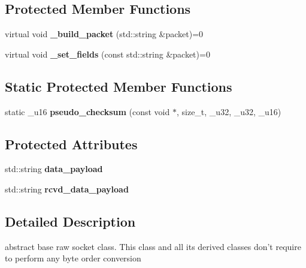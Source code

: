 \subsection*{Protected Member Functions}
\begin{CompactItemize}
\item 
\hypertarget{classsocketpp_1_1RawSocket_eb0a3f716c0fc46efa4123acf0fe1e66}{
virtual void \textbf{\_\-build\_\-packet} (std::string \&packet)=0}
\label{classsocketpp_1_1RawSocket_eb0a3f716c0fc46efa4123acf0fe1e66}

\item 
\hypertarget{classsocketpp_1_1RawSocket_45e6b041703cb8ae0f93dd19766865d5}{
virtual void \textbf{\_\-set\_\-fields} (const std::string \&packet)=0}
\label{classsocketpp_1_1RawSocket_45e6b041703cb8ae0f93dd19766865d5}

\end{CompactItemize}
\subsection*{Static Protected Member Functions}
\begin{CompactItemize}
\item 
\hypertarget{classsocketpp_1_1RawSocket_c9422942a0ed23c9900d26426a96a0ee}{
static \_\-u16 \textbf{pseudo\_\-checksum} (const void $\ast$, size\_\-t, \_\-u32, \_\-u32, \_\-u16)}
\label{classsocketpp_1_1RawSocket_c9422942a0ed23c9900d26426a96a0ee}

\end{CompactItemize}
\subsection*{Protected Attributes}
\begin{CompactItemize}
\item 
\hypertarget{classsocketpp_1_1RawSocket_4d3a1236c4ac42ab029323ae14586ff8}{
std::string \textbf{data\_\-payload}}
\label{classsocketpp_1_1RawSocket_4d3a1236c4ac42ab029323ae14586ff8}

\item 
\hypertarget{classsocketpp_1_1RawSocket_3e166c1c401c30b5721dc54f93772b36}{
std::string \textbf{rcvd\_\-data\_\-payload}}
\label{classsocketpp_1_1RawSocket_3e166c1c401c30b5721dc54f93772b36}

\end{CompactItemize}


\subsection{Detailed Description}
abstract base raw socket class. This class and all its derived classes don't require to perform any byte order conversion 

